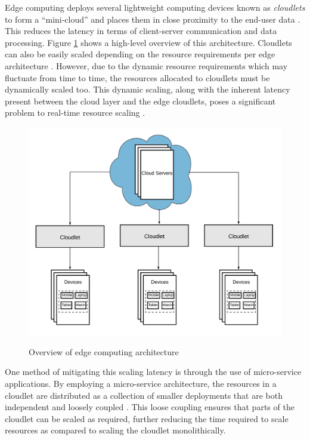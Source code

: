 Edge computing deploys several lightweight computing devices known as \textit{cloudlets} to form a ``mini-cloud'' and places them in close proximity to the end-user data \cite{liu2019survey}. This reduces the latency in terms of client-server communication and data processing. Figure \ref{fig:edge-architecture-overview} shows a high-level overview of this architecture. Cloudlets can also be easily scaled depending on the resource requirements per edge architecture \cite{ren2019survey}. However, due to the dynamic resource requirements which may fluctuate from time to time, the resources allocated to cloudlets must be dynamically scaled too. This dynamic scaling, along with the inherent latency present between the cloud layer and the edge cloudlets, poses a significant problem to real-time resource scaling \cite{varghese2016challenges}.\par

\begin{figure}[htb]
    \centering
    \caption{Overview of edge computing architecture}
    \includegraphics[width=0.9\linewidth]{Figures/Edge-Architecture-Overview.pdf}
    \label{fig:edge-architecture-overview}
\end{figure}

One method of mitigating this scaling latency is through the use of micro-service applications. By employing a micro-service architecture, the resources in a cloudlet are distributed as a collection of smaller deployments that are both independent and loosely coupled \cite{villamizar2015evaluating}. This loose coupling ensures that parts of the cloudlet can be scaled as required, further reducing the time required to scale resources as compared to scaling the cloudlet monolithically.\par

